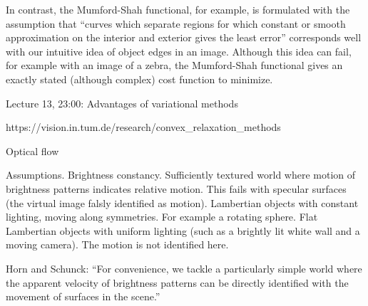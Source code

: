\documentclass{article}
\begin{document}
In contrast, the Mumford-Shah functional, for example, is formulated with the assumption that
``curves which separate regions for which constant or smooth approximation on the interior and exterior gives the least error'' corresponds well with our intuitive idea
of object edges in an image. Although this idea can fail, for example with an image of a zebra, the Mumford-Shah functional gives an exactly stated
(although complex) cost function to minimize.

Lecture 13, 23:00: Advantages of variational methods

https://vision.in.tum.de/research/convex_relaxation_methods



Optical flow

Assumptions.
Brightness constancy. Sufficiently textured world where motion of brightness patterns indicates relative motion.
This fails with specular surfaces (the virtual image falsly identified as motion).
Lambertian objects with constant lighting, moving along symmetries. For example a rotating sphere. Flat Lambertian objects
with uniform lighting (such as a brightly lit white wall and a moving camera). The motion is not identified here.

Horn and Schunck:
    ``For convenience, we tackle a particularly simple world where the apparent velocity of brightness patterns can be directly
      identified with the movement of surfaces in the scene.''
\end{document}
